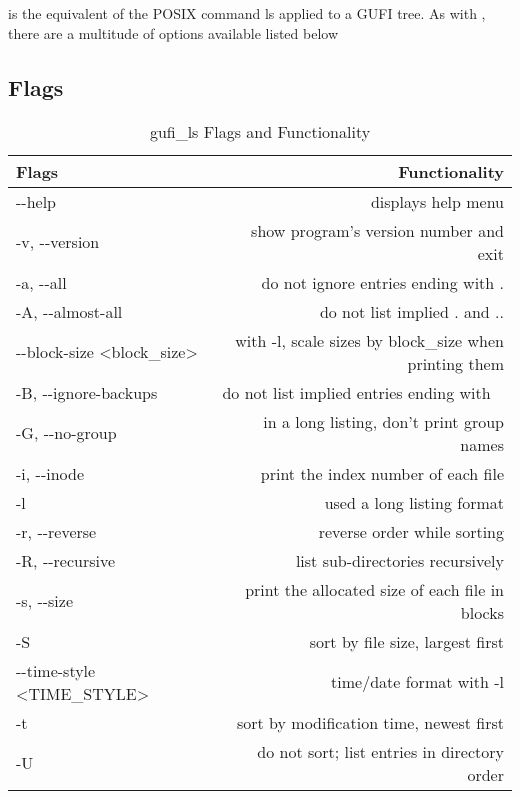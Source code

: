 \section{\gufils}
\gufils is the equivalent of the POSIX command ls applied to a GUFI
tree. As with \gufifind, there are a multitude of options available
listed below

\subsection{Flags}
\begin{table} [h]
  \centering
  \begin{tabular}{| l | r |}
    \hline
    Flags & Functionality \\
    \hline
    -{}-help & displays help menu \\
    \hline
    -v, -{}-version & show program's version number and exit \\
    \hline
    -a, -{}-all & do not ignore entries ending with . \\
    \hline
    -A, -{}-almost-all & do not list implied . and .. \\
    \hline
    -{}-block-size \textless block\_size\textgreater & with -l, scale sizes by block\_size when printing them \\
    \hline
    -B, -{}-ignore-backups & do not list implied entries ending with ~ \\
    \hline
    -G, -{}-no-group & in a long listing, don't print group names \\
    \hline
    -i, -{}-inode & print the index number of each file \\
    \hline
    -l & used a long listing format \\
    \hline
    -r, -{}-reverse & reverse order while sorting \\
    \hline
    -R, -{}-recursive & list sub-directories recursively \\
    \hline
    -s, -{}-size & print the allocated size of each file in blocks \\
    \hline
    -S & sort by file size, largest first \\
    \hline
    -{}-time-style \textless TIME\_STYLE\textgreater & time/date format with -l \\
    \hline
    -t & sort by modification time, newest first \\
    \hline
    -U & do not sort; list entries in directory order \\
    \hline
  \end{tabular}
  \caption{\label{fig:gufi_ls flags}{gufi\_ls Flags and Functionality}}
\end{table}


